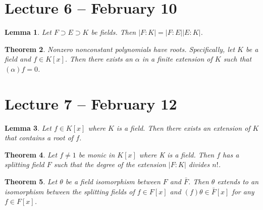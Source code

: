 \documentclass[letterpaper]{article}
\newtheorem{theorem}{Theorem}[section]
\newtheorem{lemma}[theorem]{Lemma}
\begin{document}
\section{Lecture 6 -- February 10}

\begin{lemma}
Let $F \supset E \supset K$ be fields. Then $|F \colon K| = |F \colon E||E \colon K|$.
\end{lemma}

\begin{theorem}
Nonzero nonconstant polynomials have roots. Specifically, let $K$ be a field and $f \in K[x]$. Then there exists an $\alpha$ in a finite extension of $K$ such that $(\alpha)f = 0$.
\end{theorem}

\section{Lecture 7 -- February 12}

\begin{lemma}
Let $f \in K[x]$ where $K$ is a field.  Then there exists an extension of $K$ that contains a root of $f$.
\end{lemma}

\begin{theorem}
Let $f \neq 1$ be monic in $K[x]$ where K is a field.  Then $f$ has a splitting field $F$ such that the degree of the extension $|F \colon K|$  divides $n!$.
\end{theorem}

\begin{theorem}
Let $\theta$ be a field isomorphism between $F$ and $\bar{F}$. Then $\theta$ extends to an isomorphism between the splitting fields of $f \in F[x]$ and $(f) \theta \in \bar{F}[x]$ for any $f \in F[x]$.
\end{theorem}
\end{document}
